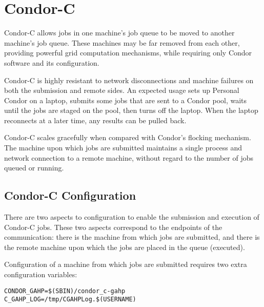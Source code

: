 
\section{\label{sec:Condor-C}Condor-C}

Condor-C allows jobs in one machine's job queue to
be moved to another machine's job queue.
These machines may be far removed from each other,
providing powerful grid computation mechanisms,
while requiring only Condor software and its configuration.

Condor-C is highly resistant to network disconnections and machine failures on both the submission and remote sides.
An expected usage
sets up Personal Condor on a laptop,
submits some jobs that are sent to a Condor pool,
waits until the jobs are staged on the pool,
then turns off the laptop.
When the laptop reconnects at a later time,
any results can be pulled back.

Condor-C scales gracefully when compared with Condor's flocking
mechanism.
The machine upon which jobs are submitted
maintains a single process and network connection to a remote machine,
without regard to the number
of jobs queued or running.

\subsection{\label{sec:Condor-C-Config}Condor-C Configuration}
There are two aspects to configuration to enable the
submission and execution of Condor-C jobs.
These two aspects correspond to the endpoints of the 
communication: there is the machine from which jobs are
submitted, and there is the remote machine upon which the
jobs are placed in the queue (executed).

Configuration of a machine from which jobs are submitted
requires two extra configuration variables:

\footnotesize
\begin{verbatim}
CONDOR_GAHP=$(SBIN)/condor_c-gahp
C_GAHP_LOG=/tmp/CGAHPLog.$(USERNAME)
\end{verbatim}
\normalsize

